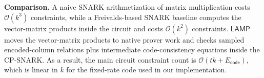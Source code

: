 \documentclass[conference,compsoc]{IEEEtran}
\newcommand{\protocol}{\textsf{LAMP}}   %
\theoremstyle{plain}
\theoremstyle{definition}
\theoremstyle{remark}
\begin{document}
\noindent\textbf{Comparison.}
A naive SNARK arithmetization of matrix multiplication costs
\(\mathcal{O}(k^3)\) constraints, while a Freivalds-based SNARK baseline computes
the vector-matrix products inside the circuit and costs \(\mathcal{O}(k^2)\) constraints.  
\(\protocol\) moves the vector-matrix products to native prover work and checks
sampled encoded-column relations plus intermediate code-consistency equations
inside the CP-SNARK.
As a result, the main circuit constraint count is
\(\mathcal{O}(tk+E_{\mathsf{code}})\), which is linear in \(k\) for the
fixed-rate code used in our implementation.
\end{document}

